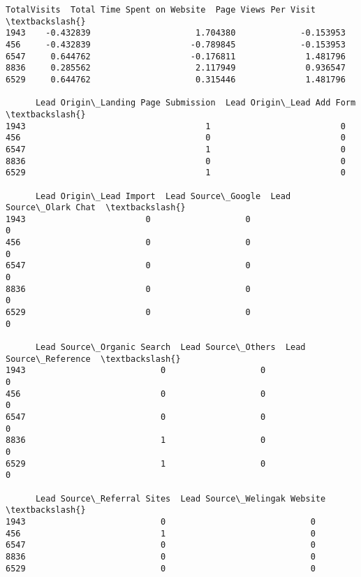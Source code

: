 \documentclass[11pt]{article}
\makeatletter
\newcommand{\boxspacing}{\kern\kvtcb@left@rule\kern\kvtcb@boxsep}
\newcommand{\prompt}[4]{
        \ttfamily\llap{{\color{#2}[#3]:\hspace{3pt}#4}}\vspace{-\baselineskip}
    }
\makeatother
\begin{document}
            \begin{tcolorbox}[breakable, size=fbox, boxrule=.5pt, pad at break*=1mm, opacityfill=0]
\prompt{Out}{outcolor}{71}{\boxspacing}
\begin{Verbatim}[commandchars=\\\{\}]
      TotalVisits  Total Time Spent on Website  Page Views Per Visit  \textbackslash{}
1943    -0.432839                     1.704380             -0.153953
456     -0.432839                    -0.789845             -0.153953
6547     0.644762                    -0.176811              1.481796
8836     0.285562                     2.117949              0.936547
6529     0.644762                     0.315446              1.481796

      Lead Origin\_Landing Page Submission  Lead Origin\_Lead Add Form  \textbackslash{}
1943                                    1                          0
456                                     0                          0
6547                                    1                          0
8836                                    0                          0
6529                                    1                          0

      Lead Origin\_Lead Import  Lead Source\_Google  Lead Source\_Olark Chat  \textbackslash{}
1943                        0                   0                       0
456                         0                   0                       0
6547                        0                   0                       0
8836                        0                   0                       0
6529                        0                   0                       0

      Lead Source\_Organic Search  Lead Source\_Others  Lead Source\_Reference  \textbackslash{}
1943                           0                   0                      0
456                            0                   0                      0
6547                           0                   0                      0
8836                           1                   0                      0
6529                           1                   0                      0

      Lead Source\_Referral Sites  Lead Source\_Welingak Website  \textbackslash{}
1943                           0                             0
456                            1                             0
6547                           0                             0
8836                           0                             0
6529                           0                             0


\end{Verbatim}
\end{tcolorbox}
\end{document}
